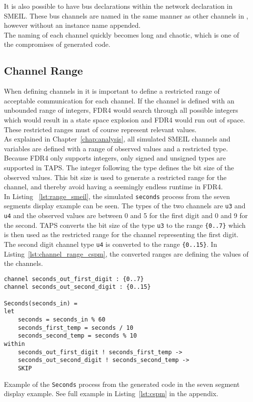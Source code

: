It is also possible to have bus declarations within the network declaration in SMEIL. These bus channels are named in the same manner as other channels in \cspm{}, however without an instance name appended.\\

The naming of each channel quickly becomes long and chaotic, which is one of the compromises of generated code.
\subsection{\cspm{} Channel Range}
When defining channels in \cspm{} it is important to define a restricted range of acceptable communication for each channel. If the channel is defined with an unbounded range of integers, FDR4 would search through all possible integers which would result in a state space explosion and FDR4 would run out of space. These restricted ranges must of course represent relevant values.\\

As explained in Chapter~\ref{chap:analysis}, all simulated SMEIL channels and variables are defined with a range of observed values and a restricted type.
Because FDR4 only supports integers, only signed and unsigned types are supported in TAPS. The integer following the type defines the bit size of the observed values. This bit size is used to generate a restricted range for the \cspm{} channel, and thereby avoid having a seemingly endless runtime in FDR4.\\

In Listing ~\ref{lst:range_smeil}, the simulated \texttt{seconds} process from the seven segments display example can be seen. The types of the two channels are \texttt{u3} and \texttt{u4} and the observed values are between 0 and 5 for the first digit and 0 and 9 for the second. TAPS converts the bit size of the type \texttt{u3} to the range \texttt{\{0..7\}} which is then used as the restricted range for the \cspm{} channel representing the first digit. The second digit channel type \texttt{u4} is converted to the range \texttt{\{0..15\}}. In Listing~\ref{lst:channel_range_cspm}, the converted ranges are defining the values of the \cspm{} channels.\\

\begin{listing}
\begin{verbatim}
channel seconds_out_first_digit : {0..7}
channel seconds_out_second_digit : {0..15}

Seconds(seconds_in) =
let
    seconds = seconds_in % 60
    seconds_first_temp = seconds / 10
    seconds_second_temp = seconds % 10
within
    seconds_out_first_digit ! seconds_first_temp ->
    seconds_out_second_digit ! seconds_second_temp ->
    SKIP
\end{verbatim}
\caption{Example of the \texttt{Seconds} process from the generated \cspm{} code in the seven segment display example. See full example in Listing~\ref{lst:cspm} in the appendix.}
\label{lst:channel_range_cspm}
\end{listing}

